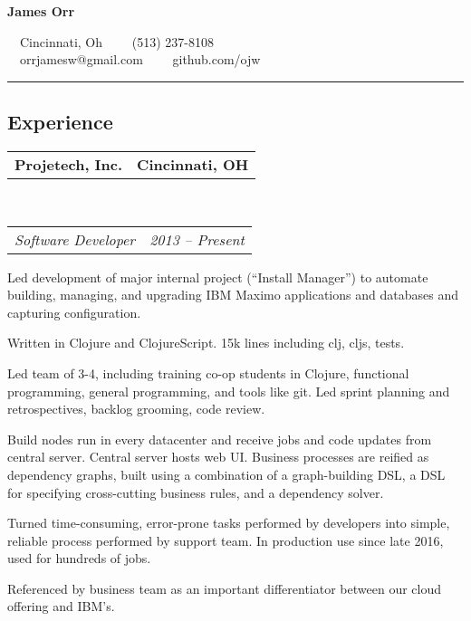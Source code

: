 \documentclass[10pt,letterpaper]{article}
\makeatletter
\newcommand{\headerrow}[2]
{\begin{tabular*}{\linewidth}{l@{\extracolsep{\fill}}r}
	#1 &
	#2 \\
\end{tabular*}}
\makeatother
\begin{document}
\begin{center}
{\LARGE \textbf{James Orr}}

\ \ Cincinnati, Oh\ \ \textbullet
\ \ (513) 237-8108
\\
\ \ orrjamesw@gmail.com\ \ \textbullet
\ \ github.com/ojw
\end{center}

\hrule
\vspace{-0.4em}
\subsection*{Experience}

\headerrow
    {\textbf{Projetech, Inc.}}
    {\textbf{Cincinnati, OH}}
    \\
    \headerrow
	{\emph{Software Developer}}
	{\emph{2013 -- Present}}
	\begin{itemize*}
	\item Led development of major internal project (``Install Manager'') to automate building, managing, and upgrading IBM Maximo applications and databases and capturing configuration.
          \begin{itemize*}
          \item Written in Clojure and ClojureScript.  15k lines including clj, cljs, tests.
          \item Led team of 3-4, including training co-op students in Clojure, functional programming, general programming, and tools like git.  Led sprint planning and retrospectives, backlog grooming, code review.
          \item Build nodes run in every datacenter and receive jobs and code updates from central server.  Central server hosts web UI.  Business processes are reified as dependency graphs, built using a combination of a graph-building DSL, a DSL for specifying cross-cutting business rules, and a dependency solver.
          \item Turned time-consuming, error-prone tasks performed by developers into simple, reliable process performed by support team.  In production use since late 2016, used for hundreds of jobs.
          \item Referenced by business team as an important differentiator between our cloud offering and IBM's.
          \end{itemize*}


\end{itemize*}
\end{document}
